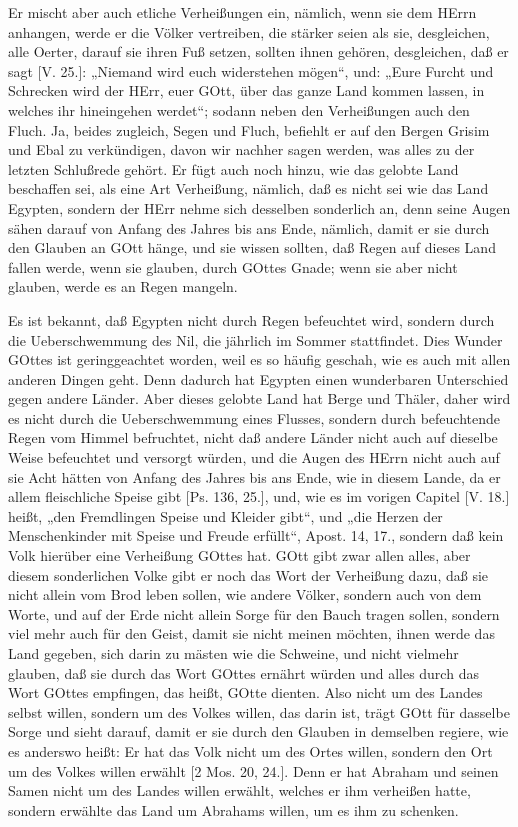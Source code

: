Er mischt aber auch etliche Verheißungen ein, nämlich, wenn sie dem HErrn anhangen, werde er die Völker vertreiben, die stärker seien als sie, desgleichen, alle Oerter, darauf sie ihren Fuß setzen, sollten ihnen gehören, desgleichen, daß er sagt [V. 25.]: „Niemand wird euch widerstehen
mögen“, und: „Eure Furcht und Schrecken wird der HErr, euer GOtt, über das ganze Land kommen lassen, in welches ihr hineingehen werdet“; sodann neben den Verheißungen auch den Fluch. Ja, beides zugleich, Segen und Fluch, befiehlt er auf den Bergen Grisim und Ebal zu verkündigen, davon wir nachher sagen werden, was alles zu der letzten Schlußrede gehört. Er fügt auch noch hinzu, wie das gelobte Land beschaffen sei, als eine Art Verheißung, nämlich, daß es nicht sei wie das Land Egypten, sondern der HErr nehme sich desselben sonderlich an, denn seine Augen sähen darauf von Anfang des Jahres bis ans Ende, nämlich, damit er sie durch den Glauben an GOtt hänge, und sie wissen sollten, daß Regen auf dieses Land fallen werde, wenn sie glauben, durch GOttes Gnade; wenn sie aber nicht glauben, werde es an Regen mangeln.

Es ist bekannt, daß Egypten nicht durch Regen befeuchtet wird, sondern durch die Ueberschwemmung des Nil, die jährlich im Sommer stattfindet. Dies Wunder GOttes ist geringgeachtet worden, weil es so häufig geschah, wie es auch mit allen anderen Dingen geht. Denn dadurch hat Egypten einen wunderbaren Unterschied gegen andere Länder. Aber dieses gelobte Land hat Berge und Thäler, daher wird es nicht durch die Ueberschwemmung eines Flusses, sondern durch befeuchtende Regen vom Himmel befruchtet, nicht daß andere Länder nicht auch auf dieselbe Weise befeuchtet und versorgt würden, und die Augen des HErrn nicht auch auf sie Acht hätten von Anfang des Jahres bis ans Ende, wie in diesem Lande, da er allem fleischliche Speise gibt [Ps. 136, 25.], und, wie es im vorigen Capitel [V. 18.] heißt, „den Fremdlingen Speise und Kleider gibt“, und „die Herzen der Menschenkinder mit Speise und Freude erfüllt“, Apost. 14, 17., sondern daß kein Volk hierüber eine Verheißung GOttes hat. GOtt gibt zwar allen alles, aber diesem sonderlichen Volke gibt er noch das Wort der Verheißung dazu, daß sie nicht allein vom Brod leben sollen, wie andere Völker, sondern auch von dem Worte, und auf der Erde nicht allein Sorge für den Bauch tragen sollen, sondern viel mehr auch für den Geist, damit sie nicht meinen möchten, ihnen werde das Land gegeben, sich darin zu mästen wie die Schweine, und nicht vielmehr glauben, daß sie durch das Wort GOttes ernährt würden und alles durch das Wort GOttes empfingen, das heißt, GOtte dienten. Also nicht um des Landes selbst willen, sondern um des Volkes willen, das darin ist, trägt GOtt für dasselbe Sorge und sieht darauf, damit er sie durch den Glauben in demselben regiere, wie es anderswo heißt: Er hat das Volk nicht um des Ortes willen, sondern den Ort um des Volkes willen erwählt [2 Mos. 20, 24.]. Denn er hat Abraham und seinen Samen nicht um des Landes willen erwählt, welches er ihm verheißen hatte, sondern erwählte das Land um Abrahams willen, um es ihm zu schenken.

